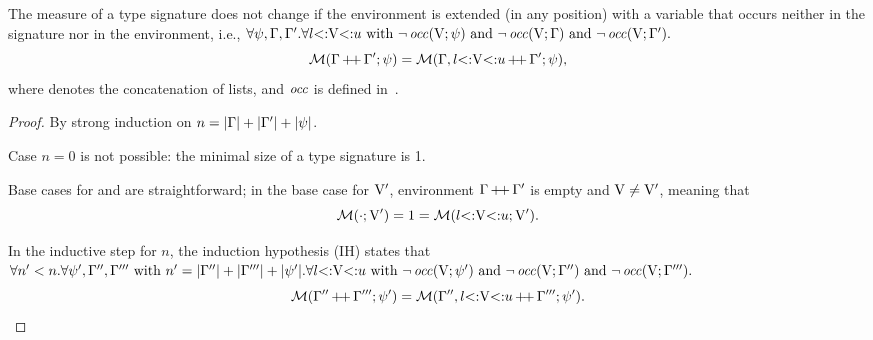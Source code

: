 \begin{lemma}%
\label{lem:msr-weakening:app}
    The measure of a type signature does not change if the environment
    is extended (in any position) with a variable that occurs neither
    in the signature nor in the environment, i.e.,
    $\forall \psi, \Gamma, \Gamma'. 
    \forall l{\operatorname{<:}}\mathrm{V}{\operatorname{<:}}u \text{ with } 
    \lnot \operatorname{\mathit{occ}}(\mathrm{V};\psi) \text{ and } 
    \lnot \operatorname{\mathit{occ}}(\mathrm{V};\Gamma) \text{ and } \lnot \operatorname{\mathit{occ}}(\mathrm{V};\Gamma').$
    \[\operatorname{\mathcal{M}}(\Gamma\operatorname{+\!+}\Gamma';\psi) = 
        \operatorname{\mathcal{M}}(\Gamma,l{\operatorname{<:}}\mathrm{V}{\operatorname{<:}}u\operatorname{+\!+}\Gamma';\psi),\]
    where  denotes the concatenation of lists,
    and $\operatorname{\mathit{occ}}$ is defined in~.
\end{lemma}
\begin{proof}
    By strong induction on $n = |\Gamma| + |\Gamma'| + |\psi|$.

    Case $n = 0$ is not possible: the minimal size of a type signature is 1.

    Base cases for \tyany and \tybot are straightforward; in the base case
    for $\mathrm{V}'$, environment $\Gamma\operatorname{+\!+}\Gamma'$ is empty and
    $\mathrm{V} \neq \mathrm{V}'$, 
    meaning that \[\operatorname{\mathcal{M}}(\cdot;\mathrm{V}') = 1 = 
    \operatorname{\mathcal{M}}(l{\operatorname{<:}}\mathrm{V}{\operatorname{<:}}u;\mathrm{V}').\]
    
    In the inductive step for $n$, the induction hypothesis (IH) states that
    $\forall n'<n. \forall \psi', \Gamma'', \Gamma'''  \text{ with }
    n' = |\Gamma''| + |\Gamma'''| + |\psi'|.
    \forall l{\operatorname{<:}}\mathrm{V}{\operatorname{<:}}u \text{ with } 
    \lnot \operatorname{\mathit{occ}}(\mathrm{V};\psi') \text{ and } 
    \lnot \operatorname{\mathit{occ}}(\mathrm{V};\Gamma'') \text{ and } \lnot \operatorname{\mathit{occ}}(\mathrm{V};\Gamma''').$
    \[\operatorname{\mathcal{M}}(\Gamma''\operatorname{+\!+}\Gamma''';\psi') = 
    \operatorname{\mathcal{M}}(\Gamma'',l{\operatorname{<:}}\mathrm{V}{\operatorname{<:}}u\operatorname{+\!+}\Gamma''';\psi').\]
    

\end{proof}
